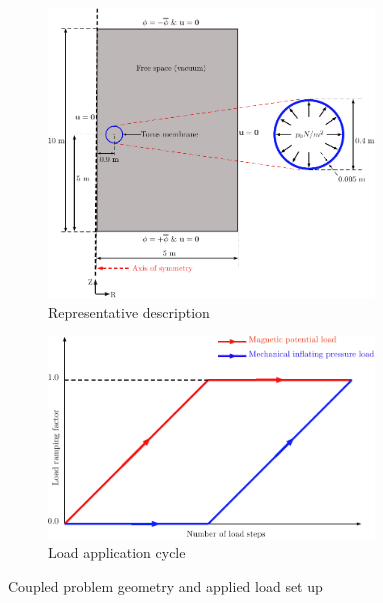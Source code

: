 \documentclass[11pt,a4paper,final]{article}
\begin{document}
\begin{figure}[h]
\centering
\begin{subfigure}{0.55\textwidth}
\centering
\includegraphics[width=0.95\textwidth]{coupled_prob_description.pdf}
\caption{Representative description}
\label{fig:3.6.1}
\end{subfigure}
\begin{subfigure}{0.44\textwidth}
\centering
\includegraphics[width=0.95\textwidth]{load_cycle.pdf}
\caption{Load application cycle}
\label{fig:3.6.2}
\end{subfigure}
\caption{Coupled problem geometry and applied load set up}
\label{fig:3.6}
\end{figure}
\end{document}
